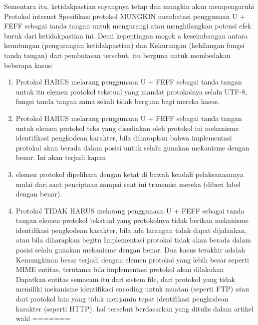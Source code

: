 Sementara itu, ketidakpastian sayangnya tetap dan mungkin akan mempengaruhi
   Protokol internet Spesifikasi protokol MUNGKIN membatasi penggunaan
   U + FEFF sebagai tanda tangan untuk mengurangi atau menghilangkan potensi
   efek buruk dari ketidakpastian ini. Demi kepentingan mogok a
   keseimbangan antara keuntungan (pengurangan ketidakpastian) dan
   Kekurangan (kehilangan fungsi tanda tangan) dari pembatasan tersebut, itu
   berguna untuk membedakan beberapa kasus:
\begin{enumerate}

    \item Protokol HARUS melarang penggunaan U + FEFF sebagai tanda tangan untuk itu
      elemen protokol tekstual yang mandat protokolnya selalu
      UTF-8, fungsi tanda tangan sama sekali tidak berguna bagi mereka
      kasus.

    \item Protokol HARUS melarang penggunaan U + FEFF sebagai tanda tangan untuk
      elemen protokol teks yang disediakan oleh protokol ini
      mekanisme identifikasi pengkodean karakter, bila diharapkan
      bahwa implementasi protokol akan berada dalam posisi untuk
      selalu gunakan mekanisme dengan benar. Ini akan terjadi kapan
	\item elemen protokol dipelihara dengan ketat di bawah kendali
      pelaksanaannya mulai dari saat penciptaan sampai saat ini
      transmisi mereka (diberi label dengan benar).

    \item Protokol TIDAK HARUS melarang penggunaan U + FEFF sebagai tanda tangan
      elemen protokol tekstual yang protokolnya tidak
      berikan mekanisme identifikasi pengkodean karakter, bila ada larangan
      tidak dapat dijalankan, atau bila diharapkan begitu
      Implementasi protokol tidak akan berada dalam posisi
      selalu gunakan mekanisme dengan benar. Dua kasus terakhir adalah
      Kemungkinan besar terjadi dengan elemen protokol yang lebih besar seperti MIME
      entitas, terutama bila implementasi protokol akan dilakukan
      Dapatkan entitas semacam itu dari sistem file, dari protokol yang tidak
      memiliki mekanisme identifikasi encoding untuk muatan (seperti FTP)
      atau dari protokol lain yang tidak menjamin tepat
      identifikasi pengkodean karakter (seperti HTTP).
     hal tersebut berdasarkan yang ditulis dalam artikel wahl \cite{wahl1997lightweight}
=======



\end{enumerate}
